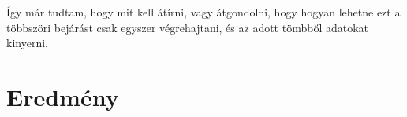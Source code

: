 \noindent

Így már tudtam, hogy mit kell átírni, vagy átgondolni, hogy hogyan lehetne ezt a többszöri bejárást csak egyszer végrehajtani, és az adott tömbből adatokat kinyerni.
\section{Eredmény}
